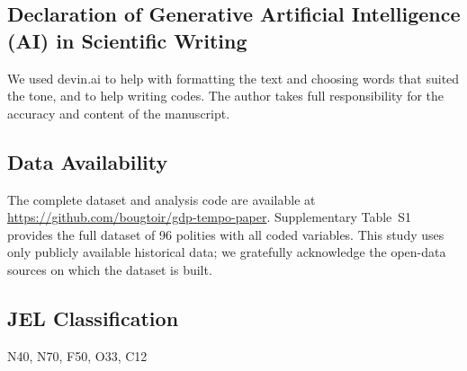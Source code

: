 \documentclass[pdflatex,sn-basic]{sn-jnl}
\theoremstyle{thmstyleone}%
\theoremstyle{thmstyletwo}%
\theoremstyle{thmstylethree}%
\begin{document}
\subsection*{Declaration of Generative Artificial Intelligence (AI) in Scientific Writing}
We used devin.ai to help with formatting the text and choosing words that suited the tone, and to help writing codes. The author takes full responsibility for the accuracy and content of the manuscript.

\subsection*{Data Availability}
The complete dataset and analysis code are available at \url{https://github.com/bougtoir/gdp-tempo-paper}. Supplementary Table~S1 provides the full dataset of 96 polities with all coded variables. This study uses only publicly available historical data; we gratefully acknowledge the open-data sources on which the dataset is built.

\subsection*{JEL Classification}
N40, N70, F50, O33, C12


\end{document}
